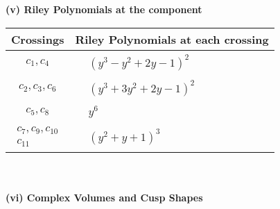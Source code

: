 \documentclass[1p]{elsarticle_modified}
\theoremstyle{definition}
\begin{document}
\newpage\renewcommand{\arraystretch}{1}
\flushleft \textbf{(v) Riley Polynomials at the component}\newline \\
\begin{tabular}{m{50pt}|m{274pt}}
Crossings & \hspace{64pt}Riley Polynomials at each crossing \\
\hline $$\begin{aligned}c_{1},c_{4}\end{aligned}$$&$\begin{aligned}
&(y^3- y^2+2 y-1)^2
\end{aligned}$\\
\hline $$\begin{aligned}c_{2},c_{3},c_{6}\end{aligned}$$&$\begin{aligned}
&(y^3+3 y^2+2 y-1)^2
\end{aligned}$\\
\hline $$\begin{aligned}c_{5},c_{8}\end{aligned}$$&$\begin{aligned}
&y^6
\end{aligned}$\\
\hline $$\begin{aligned}c_{7},c_{9},c_{10}\\c_{11}\end{aligned}$$&$\begin{aligned}
&(y^2+y+1)^3
\end{aligned}$\\
\hline
\end{tabular}\\~\\
\newpage\flushleft \textbf{(vi) Complex Volumes and Cusp Shapes}
\end{document}
